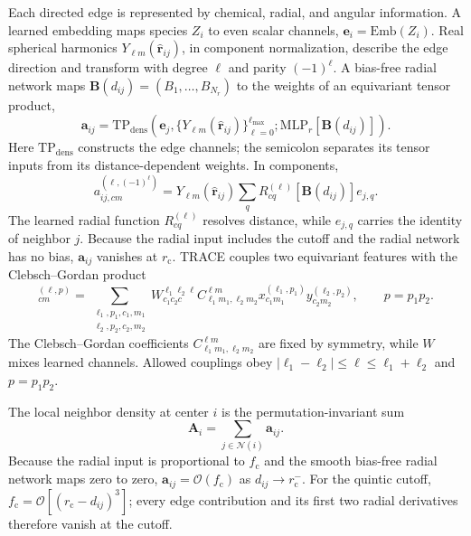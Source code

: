 \documentclass[aps,prx,preprint,notitlepage,superscriptaddress,nofootinbib,floatfix]{revtex4-2}
\newcommand{\calN}{\mathcal{N}}
\newcommand{\vect}[1]{\bm{#1}}
\newif\ifshowrevisions
\newcommand{\draftthirtytwo}[1]{%
  \ifshowrevisions\textcolor{draftthirtytwocolor}{#1}\else#1\fi}
\begin{document}
Each directed edge is represented by chemical, radial, and
angular information. A learned embedding maps species $Z_i$ to even scalar
channels, $\vect e_i=\mathrm{Emb}(Z_i)$. Real spherical harmonics
$Y_{\ell m}(\widehat{\vect r}_{ij})$, in component normalization, describe the edge direction and transform with degree $\ell$ and parity $(-1)^\ell$. A bias-free radial network maps 
$\vect B(d_{ij})=(B_1,\ldots,B_{N_r})$ to the weights of an equivariant tensor product,
\begin{equation}
 \vect a_{ij}=
 \mathrm{TP}_{\mathrm{dens}}\!\left(
   \vect e_j,
   \{Y_{\ell m}(\widehat{\vect r}_{ij})\}_{\ell=0}^{\ell_{\max}};
   \mathrm{MLP}_{r}[\vect B(d_{ij})]
 \right).
 \label{eq:edge-density}
\end{equation}
Here $\mathrm{TP}_{\mathrm{dens}}$ constructs the edge channels; the semicolon separates its tensor inputs from its distance-dependent weights. In components,
\begin{equation}
 a^{(\ell,(-1)^\ell)}_{ij,cm}
 =Y_{\ell m}(\widehat{\vect r}_{ij})
 \sum_q R^{(\ell)}_{cq}[\vect B(d_{ij})]e_{j,q}.
 \label{eq:edge-density-components}
\end{equation}
The learned radial function $R^{(\ell)}_{cq}$ resolves
distance, while $e_{j,q}$ carries the identity of neighbor $j$. Because the radial input includes the cutoff and the radial network has no bias,
$\vect a_{ij}$ vanishes at $r_{\mathrm c}$. TRACE couples two equivariant
features with the Clebsch--Gordan product
\begin{equation}
 [\vect x\otimes_{\mathrm{CG}}\vect y]^{(\ell,p)}_{cm}
 =\sum_{\substack{\ell_1,p_1,c_1,m_1\\
                   \ell_2,p_2,c_2,m_2}}
 W^{\ell_1\ell_2\ell}_{c_1c_2c}
 C^{\ell m}_{\ell_1m_1,\ell_2m_2}
 x^{(\ell_1,p_1)}_{c_1m_1}y^{(\ell_2,p_2)}_{c_2m_2},
 \qquad p=p_1p_2.
 \label{eq:cg}
\end{equation}
The Clebsch--Gordan coefficients
$C^{\ell m}_{\ell_1m_1,\ell_2m_2}$ are fixed by symmetry, while $W$ mixes
learned channels. Allowed couplings obey
$|\ell_1-\ell_2|\le \ell\le \ell_1+\ell_2$ and $p=p_1p_2$.

The local neighbor density at center $i$ is the permutation-invariant sum
\begin{equation}
 \vect A_i=\sum_{j\in\calN(i)}\vect a_{ij}.
 \label{eq:density}
\end{equation}
\draftthirtytwo{Because the radial input is proportional to
$f_{\mathrm c}$ and the smooth bias-free radial network maps zero to zero,
$\vect a_{ij}=\mathcal O(f_{\mathrm c})$ as
$d_{ij}\rightarrow r_{\mathrm c}^{-}$. For the quintic cutoff,
$f_{\mathrm c}=\mathcal O[(r_{\mathrm c}-d_{ij})^3]$; every edge
contribution and its first two radial derivatives therefore vanish at the
cutoff.}
\end{document}
